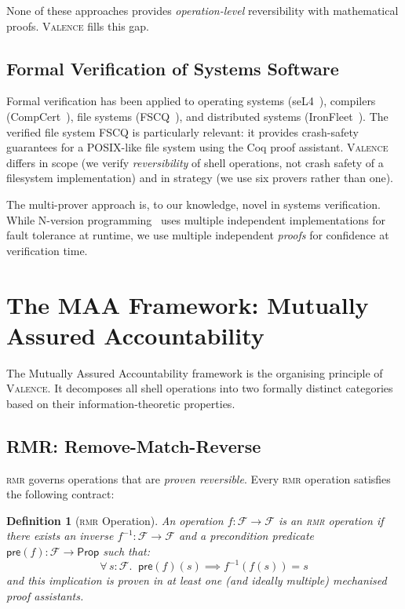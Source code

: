 \documentclass[11pt,a4paper]{article}
\newtheorem{definition}[theorem]{Definition}
\newcommand{\FS}{\mathcal{F}}
\newcommand{\inv}[1]{#1^{-1}}
\newcommand{\pre}[1]{\mathsf{pre}(#1)}
\newcommand{\valence}{\textsc{Valence}}
\newcommand{\rmr}{\textsc{rmr}}
\begin{document}
None of these approaches provides \emph{operation-level} reversibility with
mathematical proofs. \valence{} fills this gap.

\subsection{Formal Verification of Systems Software}

Formal verification has been applied to operating systems
(seL4~\citep{klein2009}), compilers (CompCert~\citep{leroy2009}), file systems
(FSCQ~\citep{chen2015}), and distributed systems
(IronFleet~\citep{hawblitzel2015}). The verified file system FSCQ is
particularly relevant: it provides crash-safety guarantees for a POSIX-like
file system using the Coq proof assistant. \valence{} differs in scope (we
verify \emph{reversibility} of shell operations, not crash safety of a
filesystem implementation) and in strategy (we use six provers rather than
one).

The multi-prover approach is, to our knowledge, novel in systems verification.
While N-version programming~\citep{avizienis1985} uses multiple independent
implementations for fault tolerance at runtime, we use multiple independent
\emph{proofs} for confidence at verification time.

\section{The MAA Framework: Mutually Assured Accountability}
\label{sec:maa}

The Mutually Assured Accountability framework is the organising principle of
\valence{}. It decomposes all shell operations into two formally distinct
categories based on their information-theoretic properties.

\subsection{RMR: Remove-Match-Reverse}

\rmr{} governs operations that are \emph{proven reversible}. Every \rmr{}
operation satisfies the following contract:

\begin{definition}[\rmr{} Operation]
\label{def:rmr}
An operation $f : \FS \to \FS$ is an \rmr{} operation if there exists an
inverse $\inv{f} : \FS \to \FS$ and a precondition predicate
$\pre{f} : \FS \to \mathsf{Prop}$ such that:
\[
  \forall\, s : \FS.\;\; \pre{f}(s) \implies \inv{f}(f(s)) = s
\]
and this implication is proven in at least one (and ideally multiple)
mechanised proof assistants.
\end{definition}
\end{document}
